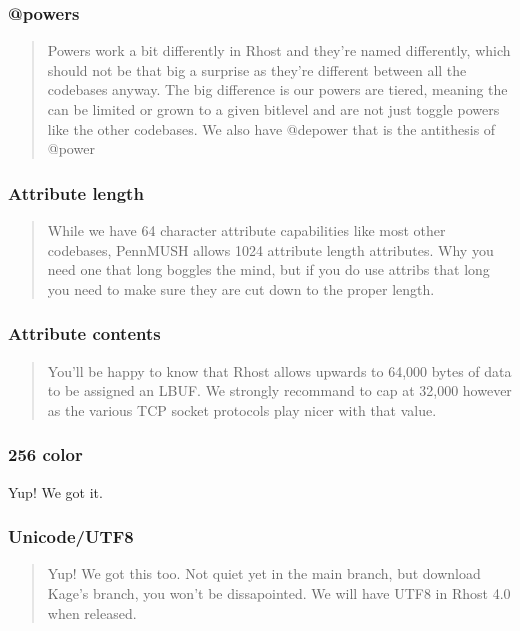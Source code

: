 \documentclass[letterpaper,10pt,english]{sphinxmanual}
\begin{document}
\subsubsection{@powers}
\label{\detokenize{differences:powers}}\begin{quote}

\sphinxAtStartPar
Powers work a bit differently in Rhost and they’re named
differently, which should not be that big a surprise as they’re different
between all the codebases anyway.  The big difference is our powers are
tiered, meaning the can be limited or grown to a given bitlevel and are
not just toggle powers like the other codebases.  We also have @depower
that is the anti\sphinxhyphen{}thesis of @power
\end{quote}


\subsubsection{Attribute length}
\label{\detokenize{differences:attribute-length}}\begin{quote}

\sphinxAtStartPar
While we have 64 character attribute capabilities like
most other codebases, PennMUSH allows 1024 attribute length attributes.
Why you need one that long boggles the mind, but if you do use attribs
that long you need to make sure they are cut down to the proper length.
\end{quote}


\subsubsection{Attribute contents}
\label{\detokenize{differences:attribute-contents}}\begin{quote}

\sphinxAtStartPar
You’ll be happy to know that Rhost allows upwards
to 64,000 bytes of data to be assigned an LBUF.  We strongly recommand
to cap at 32,000 however as the various TCP socket protocols play nicer
with that value.
\end{quote}


\subsubsection{256 color}
\label{\detokenize{differences:color}}
\sphinxAtStartPar
Yup!  We got it.


\subsubsection{Unicode/UTF8}
\label{\detokenize{differences:unicode-utf8}}\begin{quote}

\sphinxAtStartPar
Yup!  We got this too.  Not quiet yet in the main branch,
but download Kage’s branch, you won’t be dissapointed.  We will have
UTF8 in Rhost 4.0 when released.
\end{quote}
\end{document}
